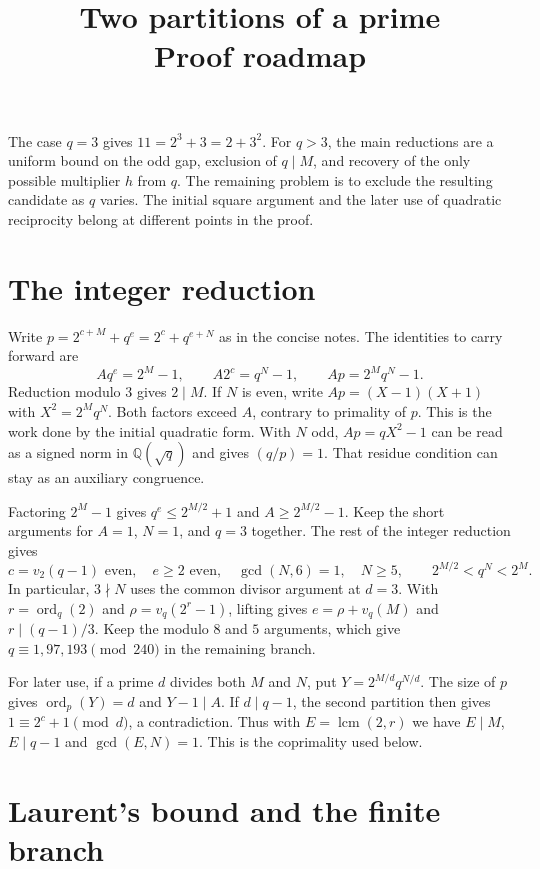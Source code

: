 \documentclass[11pt]{article}
\title{Two partitions of a prime\protect\\Proof roadmap}
\author{}
\date{}
\DeclareMathOperator{\ord}{ord}
\DeclareMathOperator{\lcm}{lcm}
\begin{document}
\maketitle

The case $q=3$ gives $11=2^3+3=2+3^2$. For $q>3$, the main
reductions are a uniform bound on the odd gap, exclusion of $q\mid M$,
and recovery of the only possible multiplier $h$ from $q$. The remaining
problem is to exclude the resulting candidate as $q$ varies.
The initial square argument and the later use of quadratic reciprocity
belong at different points in the proof.

\section{The integer reduction}

Write $p=2^{c+M}+q^e=2^c+q^{e+N}$ as in the concise notes. The
identities to carry forward are
\[
 Aq^e=2^M-1,\qquad A2^c=q^N-1,\qquad Ap=2^Mq^N-1.
\]
Reduction modulo $3$ gives $2\mid M$. If $N$ is even, write
$Ap=(X-1)(X+1)$ with $X^2=2^Mq^N$. Both factors exceed $A$,
contrary to primality of $p$. This is the work done by the initial
quadratic form. With $N$ odd, $Ap=qX^2-1$ can be read as a signed
norm in $\mathbb Q(\sqrt q)$ and gives $(q/p)=1$. That residue
condition can stay as an auxiliary congruence.

Factoring $2^M-1$ gives $q^e\le 2^{M/2}+1$ and $A\ge 2^{M/2}-1$.
Keep the short arguments for $A=1$, $N=1$, and $q=3$ together.
The rest of the integer reduction gives
\[
 c=v_2(q-1)\text{ even},\quad e\ge2\text{ even},\quad
 \gcd(N,6)=1,\quad N\ge5,\qquad 2^{M/2}<q^N<2^M.
\]
In particular, $3\nmid N$ uses the common divisor argument at $d=3$.
With $r=\ord_q(2)$ and $\rho=v_q(2^r-1)$, lifting gives
$e=\rho+v_q(M)$ and $r\mid(q-1)/3$. Keep the modulo $8$ and
$5$ arguments, which give $q\equiv1,97,193\pmod{240}$
in the remaining branch.

For later use, if a prime $d$ divides both $M$ and $N$, put
$Y=2^{M/d}q^{N/d}$. The size of $p$ gives $\ord_p(Y)=d$
and $Y-1\mid A$. If $d\mid q-1$, the second partition then gives
$1\equiv 2^c+1\pmod d$, a contradiction. Thus with
$E=\lcm(2,r)$ we have $E\mid M$, $E\mid q-1$ and $\gcd(E,N)=1$.
This is the coprimality used below.

\section{Laurent's bound and the finite branch}
\end{document}
